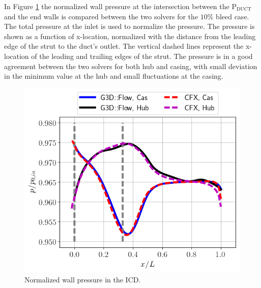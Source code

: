 In Figure \ref{fig:duct10} the normalized wall pressure at the intersection between the P$_\text{DUCT}$ and the end walls is compared between the two solvers for the $10\%$ bleed case. The total pressure at the inlet is used to normalize the pressure. The pressure is shown as a function of x-location, normalized with the distance from the leading edge of the strut to the duct's outlet. The vertical dashed lines represent the x-location of the leading and trailing edges of the strut. The pressure is in a good agreement between the two solvers for both hub and casing, with small deviation in the minimum value at the hub and small fluctuations at the casing. 
%
\begin{figure}[h!]
  \centering
  \includegraphics[width=.6\textwidth]{figures/CFXG3dDuct10.png}
    \caption{Normalized wall pressure in the ICD.} \label{fig:duct10}
\end{figure}

